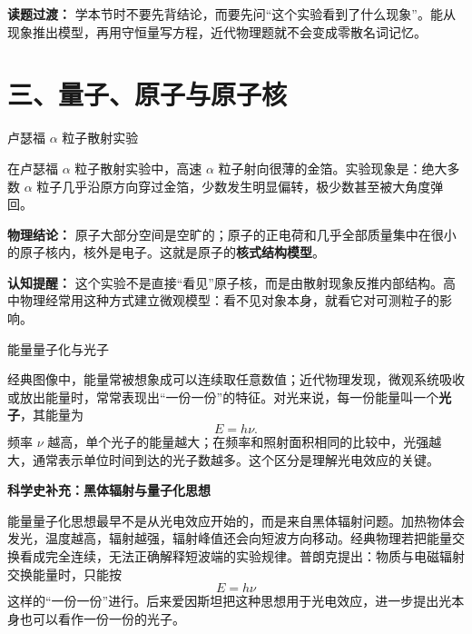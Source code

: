 \textbf{读题过渡：} 学本节时不要先背结论，而要先问“这个实验看到了什么现象”。能从现象推出模型，再用守恒量写方程，近代物理题就不会变成零散名词记忆。

\section*{三、量子、原子与原子核}

\begin{conceptbox}{卢瑟福 $\alpha$ 粒子散射实验}

在卢瑟福 $\alpha$ 粒子散射实验中，高速 $\alpha$ 粒子射向很薄的金箔。实验现象是：绝大多数 $\alpha$ 粒子几乎沿原方向穿过金箔，少数发生明显偏转，极少数甚至被大角度弹回。

\begin{center}


\label{fig:rutherford-scattering}
\end{center}

\textbf{物理结论：} 原子大部分空间是空旷的；原子的正电荷和几乎全部质量集中在很小的原子核内，核外是电子。这就是原子的\textbf{核式结构模型}。

\textbf{认知提醒：} 这个实验不是直接“看见”原子核，而是由散射现象反推内部结构。高中物理经常用这种方式建立微观模型：看不见对象本身，就看它对可测粒子的影响。
\end{conceptbox}

\begin{conceptbox}{能量量子化与光子}

经典图像中，能量常被想象成可以连续取任意数值；近代物理发现，微观系统吸收或放出能量时，常常表现出“一份一份”的特征。对光来说，每一份能量叫一个\textbf{光子}，其能量为
\[
\boxed{E=h\nu}.
\]
频率 $\nu$ 越高，单个光子的能量越大；在频率和照射面积相同的比较中，光强越大，通常表示单位时间到达的光子数越多。这个区分是理解光电效应的关键。

\begin{center}


\label{fig:quantum-energy-packets}
\end{center}
\end{conceptbox}

\textbf{科学史补充：黑体辐射与量子化思想}

能量量子化思想最早不是从光电效应开始的，而是来自黑体辐射问题。加热物体会发光，温度越高，辐射越强，辐射峰值还会向短波方向移动。经典物理若把能量交换看成完全连续，无法正确解释短波端的实验规律。普朗克提出：物质与电磁辐射交换能量时，只能按
\[
E=h\nu
\]
这样的“一份一份”进行。后来爱因斯坦把这种思想用于光电效应，进一步提出光本身也可以看作一份一份的光子。

